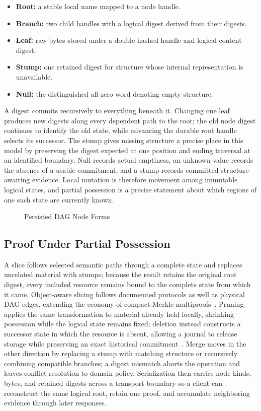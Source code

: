 \begin{itemize}
  \item \textbf{Root:} a stable local name mapped to a node handle.
  \item \textbf{Branch:} two child handles with a logical digest derived from their digests.
  \item \textbf{Leaf:} raw bytes stored under a double-hashed handle and logical content digest.
  \item \textbf{Stump:} one retained digest for structure whose internal representation is unavailable.
  \item \textbf{Null:} the distinguished all-zero word denoting empty structure.
\end{itemize}

A digest commits recursively to everything beneath it. Changing one leaf produces new digests along every dependent path to the root; the old node digest continues to identify the old state, while advancing the durable root handle selects its successor. The stump gives missing structure a precise place in this model by preserving the digest expected at one position and ending traversal at an identified boundary. Null records actual emptiness, an unknown value records the absence of a usable commitment, and a stump records committed structure awaiting evidence. Local mutation is therefore movement among immutable logical states, and partial possession is a precise statement about which regions of one such state are currently known.

\begin{figure}[htbp]
  \centering
  \resizebox{\textwidth}{!}{}
  \caption{Persisted DAG Node Forms}
  \label{fig:dag-stump}
\end{figure}

\subsection{Proof Under Partial Possession}

A slice follows selected semantic paths through a complete state and replaces unrelated material with stumps; because the result retains the original root digest, every included resource remains bound to the complete state from which it came. Object-aware slicing follows documented protocols as well as physical DAG edges, extending the economy of compact Merkle multiproofs~\cite{Ramabaja2020compact}. Pruning applies the same transformation to material already held locally, shrinking possession while the logical state remains fixed; deletion instead constructs a successor state in which the resource is absent, allowing a journal to release storage while preserving an exact historical commitment~\cite{Crosby2009efficient}. Merge moves in the other direction by replacing a stump with matching structure or recursively combining compatible branches; a digest mismatch aborts the operation and leaves conflict resolution to domain policy. Serialization then carries node kinds, bytes, and retained digests across a transport boundary so a client can reconstruct the same logical root, retain one proof, and accumulate neighboring evidence through later responses.


